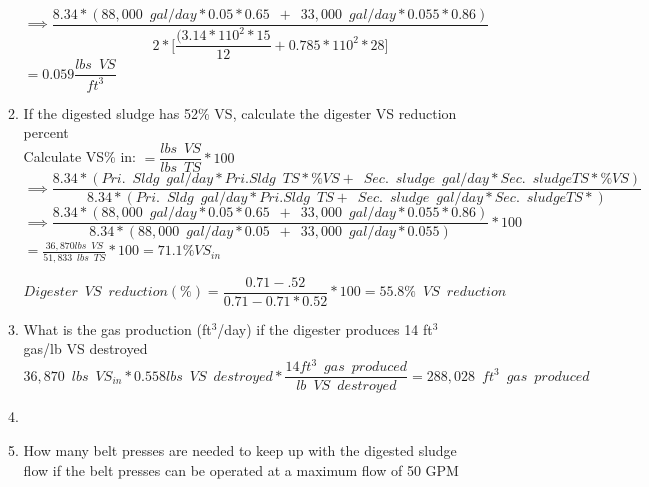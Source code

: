 \documentclass{article}
\begin{document}
\begin{enumerate}
\begin{enumerate}
$\implies \dfrac{8.34*(88,000 \enspace gal/day *0.05*0.65 \enspace+ \enspace 33,000 \enspace gal/day *0.055*0.86)}{2*\Big[\dfrac{(3.14*110^2*15}{12}+0.785*110^2*28\Big]}$
 \vspace{0.4cm}
$=\boxed{0.059 \dfrac{lbs \enspace VS}{ft^3}}$
\vspace{0.4cm}
\item If the digested sludge has 52\% VS, calculate the digester VS reduction percent\\
\vspace{0.4cm}
Calculate VS\% in: $=\dfrac{lbs \enspace VS}{lbs \enspace TS}*100$\\
$\implies \dfrac{8.34*(Pri. \enspace Sldg \enspace gal/day *Pri. Sldg \enspace TS *\%VS + \enspace Sec. \enspace sludge \enspace gal/day *Sec. \enspace sludge TS *\%VS)}{8.34*(Pri. \enspace Sldg \enspace gal/day *Pri. Sldg \enspace TS  + \enspace Sec. \enspace sludge \enspace gal/day *Sec. \enspace sludge TS *)}$\\
 \vspace{0.4cm}
$\implies \dfrac{8.34*(88,000 \enspace gal/day *0.05*0.65 \enspace+ \enspace 33,000 \enspace gal/day *0.055*0.86)}{8.34*(88,000 \enspace gal/day *0.05\enspace+ \enspace 33,000 \enspace gal/day *0.055)}*100$\\
\vspace{0.4cm}
$=\frac{36,870 lbs \enspace VS}{51,833 \enspace lbs \enspace TS}*100=\boxed{71.1 \% VS_{in}}$

$
Digester \enspace VS \enspace reduction (\%)=
	\dfrac
	{0.71 - .52}
	{0.71 - 0.71 *0.52}
	*100=\boxed{55.8\% \enspace VS \enspace reduction}
$\\
\vspace{0.5cm}

\item What is the gas production (ft$^3$/day) if the digester produces 14 ft$^3$ gas/lb VS destroyed\\
$36,870 \enspace lbs \enspace VS_{in}*0.558 lbs\enspace VS \enspace destroyed*\dfrac{14ft^3 \enspace gas \enspace produced}{lb \enspace VS \enspace destroyed}=\boxed{288,028 \enspace ft^3 \enspace gas \enspace produced}$
\\
\vspace{0.4cm}
\item \item How many belt presses are needed to keep up with the digested sludge flow if the belt presses can be operated at a maximum flow of 50 GPM \\


\end{enumerate}
\end{enumerate}
\end{document}
